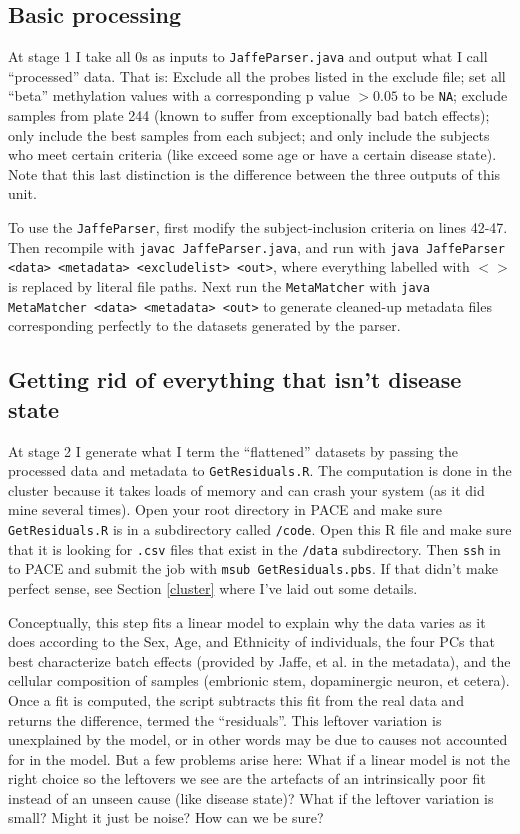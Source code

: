 \documentclass[]{article}
\begin{document}
  \subsection{Basic processing}
  At stage 1 I take all 0s as inputs to \texttt{JaffeParser.java} and output what I call ``processed'' data. That is: Exclude all the probes listed in the exclude file; set all ``beta'' methylation values with a corresponding p value $>0.05$ to be \texttt{NA}; exclude samples from plate 244 (known to suffer from exceptionally bad batch effects); only include the best samples from each subject; and only include the subjects who meet certain criteria (like exceed some age or have a certain disease state). Note that this last distinction is the difference between the three outputs of this unit.

  To use the \texttt{JaffeParser}, first modify the subject-inclusion criteria on lines 42-47. Then recompile with \texttt{javac JaffeParser.java}, and run with \texttt{java JaffeParser <data> <metadata> <excludelist> <out>}, where everything labelled with $<>$ is replaced by literal file paths. Next run the \texttt{MetaMatcher} with \texttt{java MetaMatcher <data> <metadata> <out>} to generate cleaned-up metadata files corresponding perfectly to the datasets generated by the parser.

  \subsection{Getting rid of everything that isn't disease state}
  At stage 2 I generate what I term the ``flattened'' datasets by passing the processed data and metadata to \texttt{GetResiduals.R}. The computation is done in the cluster because it takes loads of memory and can crash your system (as it did mine several times). Open your root directory in PACE and make sure \texttt{GetResiduals.R} is in a subdirectory called \texttt{/code}. Open this R file and make sure that it is looking for \texttt{.csv} files that exist in the \texttt{/data} subdirectory. Then \texttt{ssh} in to PACE and submit the job with \texttt{msub GetResiduals.pbs}. If that didn't make perfect sense, see Section \ref{cluster} where I've laid out some details.

  Conceptually, this step fits a linear model to explain why the data varies as it does according to the Sex, Age, and Ethnicity of individuals, the four PCs that best characterize batch effects (provided by Jaffe, et al. in the metadata), and the cellular composition of samples (embrionic stem, dopaminergic neuron, et cetera). Once a fit is computed, the script subtracts this fit from the real data and returns the difference, termed the ``residuals''. This leftover variation is unexplained by the model, or in other words may be due to causes not accounted for in the model. But a few problems arise here: What if a linear model is not the right choice so the leftovers we see are the artefacts of an intrinsically poor fit instead of an unseen cause (like disease state)? What if the leftover variation is small? Might it just be noise? How can we be sure?
\end{document}

